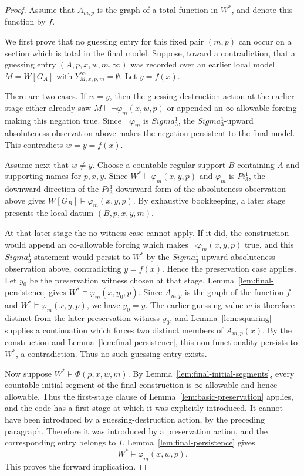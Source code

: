 \documentclass[10pt,a4paper]{amsart}
\def\Pi{Pi}%
\def\Sigma{Sigma}%
\begin{document}
\begin{proof}
Assume that $A_{m,p}$ is the graph of a total function in $W^*$, and denote this
function by $f$.

We first prove that no guessing entry for this fixed pair $(m,p)$ can occur on a
section which is total in the final model. Suppose, toward a contradiction, that
a guessing entry $(A,p,x,w,m,\infty)$ was recorded over an earlier local model
$M=W[G_A]$ with $Y^\infty_{M,x,p,m}=\emptyset$. Let $y=f(x)$.

There are two cases. If $w=y$, then the guessing-destruction action at the
earlier stage either already saw $M\models\neg\varphi_m(x,w,p)$ or appended an
$\infty$-allowable forcing making this negation true. Since
$\neg\varphi_m$ is $\Sigma^1_3$, the $\Sigma^1_3$-upward absoluteness
observation above makes the
negation persistent to the final model. This contradicts
$w=y=f(x)$.

Assume next that $w\neq y$. Choose a countable regular support $B$ containing
$A$ and supporting names for $p,x,y$. Since
$W^*\models\varphi_m(x,y,p)$ and $\varphi_m$ is $\Pi^1_3$, the downward direction
of the $\Pi^1_3$-downward form of the absoluteness observation above gives
$W[G_B]\models\varphi_m(x,y,p)$. By exhaustive bookkeeping, a later stage
presents the local datum $(B,p,x,y,m)$.

At that later stage the no-witness case cannot apply. If it did, the
construction would append an $\infty$-allowable forcing which makes
$\neg\varphi_m(x,y,p)$ true, and this $\Sigma^1_3$ statement would persist to
$W^*$ by the $\Sigma^1_3$-upward absoluteness observation above,
contradicting $y=f(x)$. Hence the
preservation case applies. Let $y_0$ be the preservation witness chosen at that
stage. Lemma~\ref{lem:final-persistence} gives
$W^*\models\varphi_m(x,y_0,p)$. Since $A_{m,p}$ is the graph of the function $f$
and $W^*\models\varphi_m(x,y,p)$, we have $y_0=y$. The earlier guessing value
$w$ is therefore distinct from the later preservation witness $y_0$, and
Lemma~\ref{lem:squaring} supplies a continuation which forces two distinct
members of $A_{m,p}(x)$. By the construction and Lemma~\ref{lem:final-persistence},
this non-functionality persists to $W^*$, a contradiction. Thus no such guessing
entry exists.

Now suppose $W^*\models\Phi(p,x,w,m)$. By
Lemma~\ref{lem:final-initial-segments}, every countable initial segment of the
final construction is $\infty$-allowable and hence allowable. Thus the
first-stage clause of Lemma~\ref{lem:basic-preservation} applies, and the code
has a first stage at which it was explicitly introduced. It cannot have been
introduced by a guessing-destruction action, by the preceding paragraph.
Therefore it was introduced by a preservation action, and the corresponding entry
belongs to $I$. Lemma~\ref{lem:final-persistence} gives
\[
   W^*\models\varphi_m(x,w,p).
\]
This proves the forward implication.


\end{proof}
\end{document}
